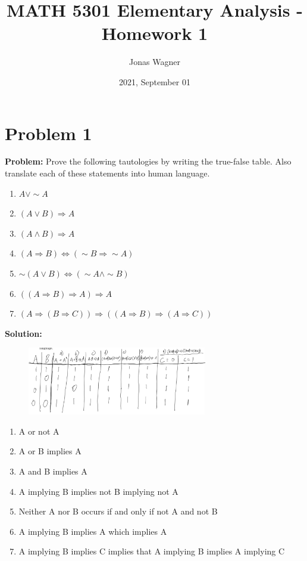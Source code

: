 \documentclass[]{article}
\title{MATH 5301 Elementary Analysis - Homework 1}
\author{Jonas Wagner}
\date{2021, September 01}
\begin{document}
\maketitle

\section{Problem 1}
\textbf{Problem:}
Prove the following tautologies by writing the true-false table.
Also translate each of these statements into human language.

\begin{enumerate}
	\item $A \lor \sim A$
	\item $(A \lor B) \Rightarrow A$
	\item $(A \land B) \Rightarrow A$
	\item $(A \Rightarrow B) \iff (\sim B \Rightarrow \sim A)$
	\item $\sim (A \lor B) \iff (\sim A \land \sim B)$
	\item $((A \Rightarrow B) \Rightarrow A) \Rightarrow A$
	\item $(A \Rightarrow (B \Rightarrow C)) \Rightarrow ((A \Rightarrow B) \Rightarrow (A \Rightarrow C))$
\end{enumerate}

\textbf{Solution:}\\
\begin{figure}[h]
	\centering
	\includegraphics*[width=0.7\textwidth]{fig/pblm1.png}
\end{figure}

\begin{enumerate}
	\item A or not A
	\item A or B implies A
	\item A and B implies A
	\item A implying B implies not B implying not A
	\item Neither A nor B occurs if and only if not A and not B
	\item A implying B implies A which implies A
	\item A implying B implies C implies that A implying B implies A implying C
\end{enumerate}
\end{document}
